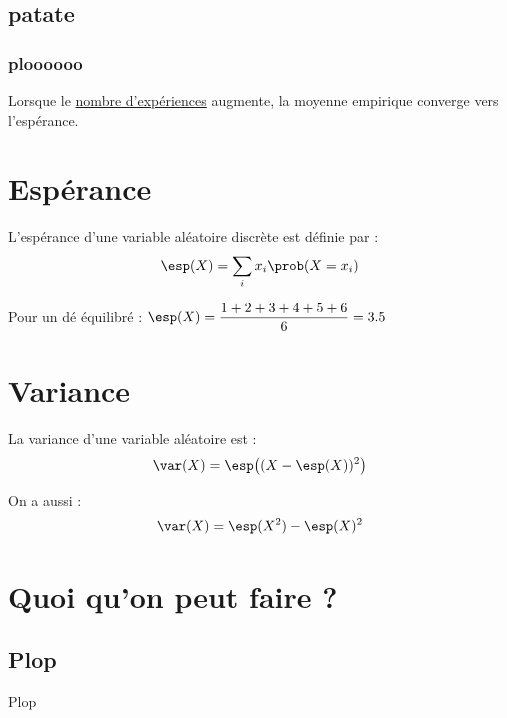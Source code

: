 \documentclass[10pt,a4paper]{article}
\begin{document}
\subsection{patate}
\subsubsection{ploooooo}

\begin{theo}
	Lorsque le \ul{nombre d'expériences} augmente, la moyenne empirique converge vers l'espérance.
\end{theo}

\section{Espérance}

\begin{defi}
	L'espérance d'une variable aléatoire discrète est définie par :
	$$\esp(X) = \sum_i x_i \prob(X = x_i)$$
\end{defi}

\begin{rem}
	Pour un dé équilibré :
	$\esp(X) = \dfrac{1+2+3+4+5+6}{6} = 3.5$
\end{rem}

\newpage

\section{Variance}

\begin{defi}
	La variance d'une variable aléatoire est :
	$$\var(X) = \esp\big((X - \esp(X))^2\big)$$
\end{defi}

\begin{prop}
	On a aussi :
	$$\var(X) = \esp(X^2) - \esp(X)^2$$
\end{prop}

\section{Quoi qu'on peut faire ?}

\subsection{Plop}

\begin{void}
	Plop \heart\spade\club\diamond
\end{void}
\end{document}
